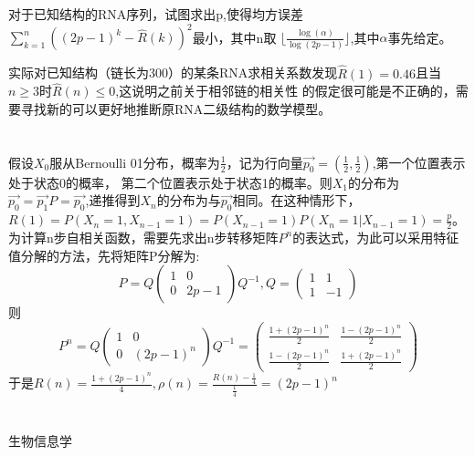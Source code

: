 \documentclass[12pt]{article}
\begin{document}
\section{\textbf{}}
对于已知结构的RNA序列，试图求出p,使得均方误差$\sum_{k=1}^n ((2p-1)^k-\hat{R}(k))^2$最小，其中n取
$\lfloor \frac{\log(\alpha)}{\log(2p-1)} \rfloor$,其中$\alpha$事先给定。

实际对已知结构（链长为300）的某条RNA求相关系数发现$\hat{R}(1)=0.46$且当$n \ge 3$时$\hat{R}(n)\le 0$,这说明之前关于相邻链的相关性
的假定很可能是不正确的，需要寻找新的可以更好地推断原RNA二级结构的数学模型。
\section{\textbf{}}
假设$X_0$服从Bernoulli 01分布，概率为$\frac{1}{2}$，记为行向量$\vec{p_0}=(\frac{1}{2},\frac{1}{2})$,第一个位置表示处于状态0的概率，
第二个位置表示处于状态1的概率。则$X_1$的分布为$\vec{p_0}=\vec{p_1}P=\vec{p_0}$,递推得到$X_n$的分布为与$\vec{p_0}$相同。在这种情形下，
$R(1)=P(X_n=1,X_{n-1}=1)=P(X_{n-1}=1)P(X_n=1|X_{n-1}=1)=\frac{p}{2}$。
为计算n步自相关函数，需要先求出n步转移矩阵$P^n$的表达式，为此可以采用特征值分解的方法，先将矩阵P分解为:
\[
P=Q\left(
\begin{array}{cc}
1 & 0 \\
0 & 2p-1
\end{array}
\right)Q^{-1},Q=\left(
\begin{array}{cc}
1 & 1 \\
1 & -1
\end{array}
\right)
\]
则\[
P^n=Q\left(
\begin{array}{cc}
1 & 0 \\
0 & (2p-1)^n
\end{array}
\right)Q^{-1}=
\left(
\begin{array}{cc}
\frac{1+(2p-1)^n}{2} & \frac{1-(2p-1)^n}{2} \\
\frac{1-(2p-1)^n}{2} & \frac{1+(2p-1)^n}{2}
\end{array}
\right)
\]
于是$R(n)=\frac{1+(2p-1)^n}{4},\rho(n)=\frac{R(n)-\frac{1}{4}}{\frac{1}{4}}=(2p-1)^n$
\section{\textbf{}}
\begin{thebibliography}{}
 生物信息学
 
\end{thebibliography}
\end{document}
